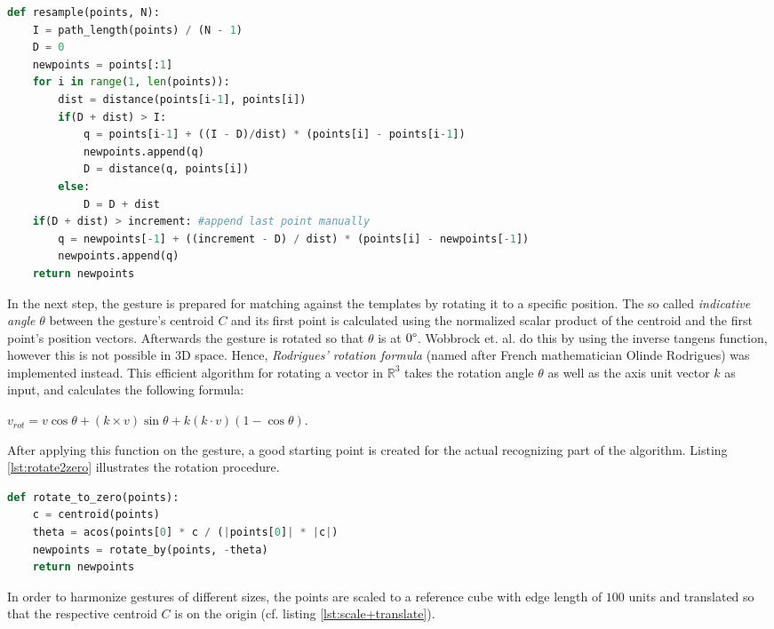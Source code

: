 \begin{lstlisting}[label=lst:resample,language=python,frame=lt,caption=Resampling of a points path into N evenly spaced points]
def resample(points, N):
	I = path_length(points) / (N - 1)
	D = 0
	newpoints = points[:1]
	for i in range(1, len(points)):
		dist = distance(points[i-1], points[i])
		if(D + dist) > I:
			q = points[i-1] + ((I - D)/dist) * (points[i] - points[i-1])
			newpoints.append(q)
			D = distance(q, points[i])
		else:
			D = D + dist
	if(D + dist) > increment: #append last point manually
		q = newpoints[-1] + ((increment - D) / dist) * (points[i] - newpoints[-1])
		newpoints.append(q)
	return newpoints
\end{lstlisting}

In the next step, the gesture is prepared for matching against the templates by rotating it to a specific position. The so called \textit{indicative angle} $\theta$ between the gesture's centroid $C$ and its first point is calculated using the normalized scalar product of the centroid and the first point's position vectors. Afterwards the gesture is rotated so that $\theta$ is at $0\degree$. Wobbrock et. al. do this by using the inverse tangens function, however this is not possible in 3D space. Hence, \textit{Rodrigues' rotation formula} (named after French mathematician Olinde Rodrigues) was implemented instead. This efficient algorithm for rotating a vector in $\mathbb{R}^3$ takes the rotation angle $\theta$ as well as the axis unit vector $k$ as input, and calculates the following formula:

\begin{center}
\(
v_{rot} = v \cos\theta + (k \times v)\sin\theta + k (k \cdot v) (1 - \cos\theta).
\) \cite{koks2006}
\end{center}

After applying this function on the gesture, a good starting point is created for the actual recognizing part of the algorithm. Listing \ref{lst:rotate2zero} illustrates the rotation procedure.

\begin{lstlisting}[label=lst:rotate2zero,language=python,frame=lt,caption=Rotation of points so that their indicative angle is at $0 \degree$]
def rotate_to_zero(points):
	c = centroid(points)
	theta = acos(points[0] * c / (|points[0]| * |c|)
	newpoints = rotate_by(points, -theta)
	return newpoints
\end{lstlisting}

In order to harmonize gestures of different sizes, the points are scaled to a reference cube with edge length of $100$ units and translated so that the respective centroid $C$ is on the origin (cf. listing \ref{lst:scale+translate}).

